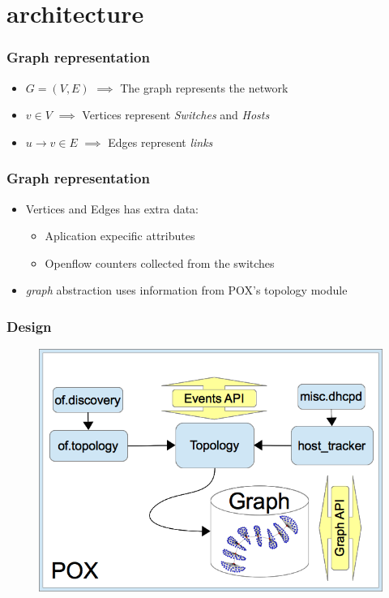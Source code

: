 \section{architecture}



%
%
\begin{frame}\frametitle{Graph representation}

    \begin{itemize}
        \item \textbf{$G=(V, E)$} $\implies$ The graph represents the network
        \item \textbf{$v \in V$} $\implies$ Vertices represent \emph{Switches} and \emph{Hosts}
        \item \textbf{$u \to v \in E$} $\implies$  Edges represent \emph{links}
    \end{itemize}

\end{frame}


%
%
\begin{frame}\frametitle{Graph representation}

    \begin{itemize}
        \item Vertices and Edges has extra data:
        \begin{itemize}
            \item Aplication expecific attributes
            \item Openflow counters collected from the switches
        \end{itemize}
        \item \emph{graph} abstraction uses information from POX's topology
            module 
    \end{itemize}

\end{frame}



%
%
\begin{frame}\frametitle{Design}

	\begin{figure}[h]
        \centering
        \includegraphics[scale=1.7]{img/design.png}
    \end{figure}
\end{frame}




